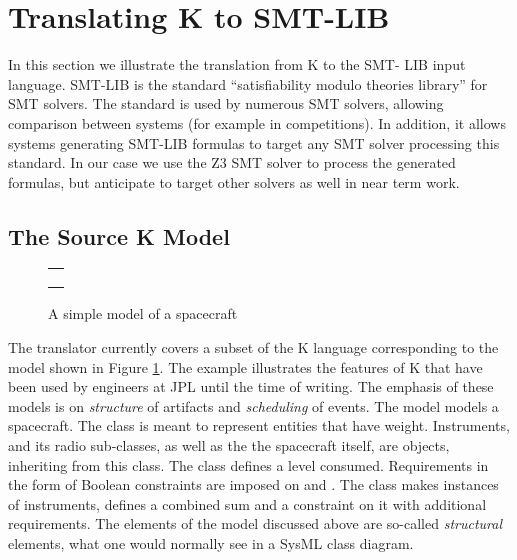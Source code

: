 
\section{Translating K to SMT-LIB}
\label{sec:k2smt}

In this section we illustrate the translation from K to the SMT- LIB
input language. SMT-LIB \cite{smt-lib} is the standard
``satisfiability modulo theories library'' for SMT solvers. The
standard is used by numerous SMT solvers, allowing comparison between
systems (for example in competitions).  In addition, it allows systems
generating SMT-LIB formulas to target any SMT solver processing this
standard. In our case we use the Z3 SMT solver \cite{de2008z3} to
process the generated formulas, but anticipate to target other solvers
as well in near term work.

\subsection{The Source K Model}

\begin{figure}
\centering
\begin{tabular}{c}
\hline \\
 \\ \\
\hline
\end{tabular}
\caption{A simple \Klang{} model of a spacecraft}
\label{fig:spacecraftSmt}
\end{figure}

The translator currently covers a subset of the K language
corresponding to the model shown in Figure
\ref{fig:spacecraftSmt}. The example illustrates the features of K
that have been used by engineers at JPL until the time of writing. The
emphasis of these models is on {\em structure} of artifacts and {\em
  scheduling} of events. The model models a spacecraft. The class
 is meant to represent entities that have
weight. Instruments, and its radio sub-classes, as well as the the
spacecraft itself, are objects, inheriting from this class. The class
 defines a  level consumed. Requirements
in the form of Boolean constraints are imposed on  and
. The  class makes instances of
instruments, defines a combined sum  and a
constraint on it with additional requirements. The elements of the
model discussed above are so-called {\em structural} elements, what
one would normally see in a SysML class diagram.

